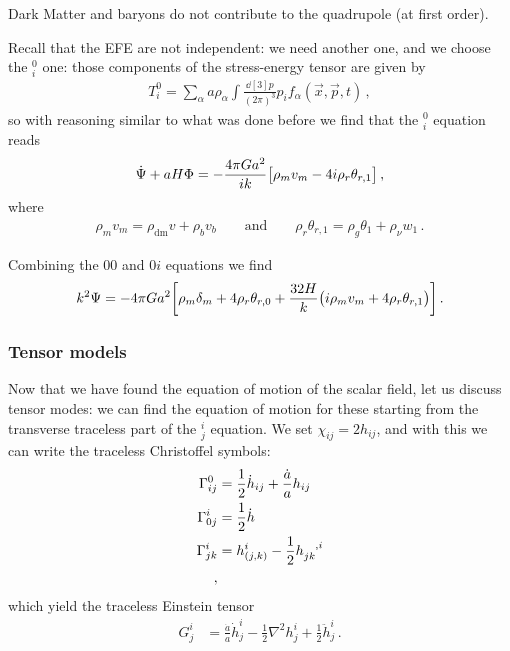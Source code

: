 \documentclass[main.tex]{subfiles}
\begin{document}
Dark Matter and baryons do not contribute to the quadrupole (at first order). 

Recall that the EFE are not independent: we need another one, and we choose the \(^0_i\) one: those components of the stress-energy tensor are given by 
%
\begin{align}
T^{0}_{i} = \sum _{\alpha } a \rho_{\alpha } 
\int \frac{ \dd[3]{p}}{(2\pi )^3} p_{i} f_\alpha  (\vec{x}, \vec{p}, t)
\,,
\end{align}
%
so with reasoning similar to what was done before we find that the \(^0_{i}\) equation reads
%
\begin{align}
\dot{\Psi} + a H \Phi = - \frac{4 \pi G a^2}{ik}
\qty[\rho_{m} v_{m} - 4 i \rho_{r} \theta_{r, 1}]
\,,
\end{align}
%
where 
%
\begin{align}
\rho_{m} v_{m} = \rho _{\text{dm}} v + \rho_{b} v_{b}
\qquad \text{and} \qquad
\rho_{r} \theta_{r, 1} = \rho_{g} \theta_1 + \rho_{\nu } w_{1}
\,.
\end{align}

Combining the \(00\) and \(0i\) equations we find 
%
\begin{align}
k^2 \Psi = -4\pi G a^2
\qty[\rho_{m} \delta_{m} + 4 \rho_{r} \theta_{r, 0}
+ \frac{32H}{k} \qty(i \rho_{m} v_m + 4 \rho_{r} \theta_{r, 1})]
\,.
\end{align}

\subsubsection{Tensor models}

Now that we have found the equation of motion of the scalar field, let us discuss tensor modes: we can find the equation of motion for these starting from the transverse traceless part of the \(^i_{j}\) equation. We set \(\chi_{ij} = 2 h_{ij}\), and with this we can write the traceless Christoffel symbols:
%
\begin{align}
\Gamma^{0}_{ij} &= \frac{1}{2} \dot{h}_{ij} + \frac{\dot{a}}{a} h_{ij}  \\
\Gamma^{i}_{0j} &= \frac{1}{2} \dot{h}  \\
\Gamma^{i}_{jk} &= h^{i}_{(j,k)} - \frac{1}{2} \tensor{h}{_{jk}^{,i}}  \\
\,,
\end{align}
%
which yield the traceless Einstein tensor 
%
\begin{align}
G^{i}_{j} &= \frac{\dot{a}}{a} \dot{h}^{i}_{j} 
- \frac{1}{2} \nabla^2 h^{i}_{j} + \frac{1}{2} \ddot{h}^{i}_{j}
\,.
\end{align}
\end{document}
